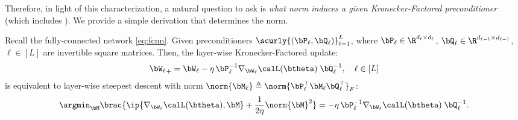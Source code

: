 Therefore, in light of this characterization, a natural question to ask is \emph{what norm induces a given Kronecker-Factored preconditioner} (which includes \Shampoo). We provide a simple derivation that determines the norm.
\begin{proposition}\label{prop:KF_norm}
    Recall the fully-connected network \eqref{eq:fcnn}. Given preconditioners $\scurly{(\bP_\ell, \bQ_\ell)}_{\ell = 1}^{L}$, where $\bP_\ell \in \R^{d_\ell \times d_\ell}$, $\bQ_\ell \in \R^{d_{\ell - 1} \times d_{\ell - 1}}$, $\ell \in [L]$ are invertible square matrices. Then, the layer-wise Kronecker-Factored update:
    \begin{align*}
        {\bW_{\ell}}_+ = \bW_{\ell} - \eta\, \bP_\ell^{-1} \nabla_{\bW_\ell} \calL(\btheta)\; \bQ_\ell^{-1}, \quad \ell \in [L]
    \end{align*}
    is equivalent to layer-wise steepest descent with norm $\norm{\bM_\ell} \triangleq \norm{\bP_\ell^\top \bM_\ell \bQ_\ell^\top}_F$:
    \begin{align*}
        \argmin_{\bM} \brac{\ip{\nabla_{\bW_\ell} \calL(\btheta), \bM} + \frac{1}{2\eta} \norm{\bM}^2} = - \eta\, \bP_\ell^{-1} \nabla_{\bW_\ell} \calL(\btheta)\; \bQ_\ell^{-1}.
    \end{align*}
\end{proposition}
